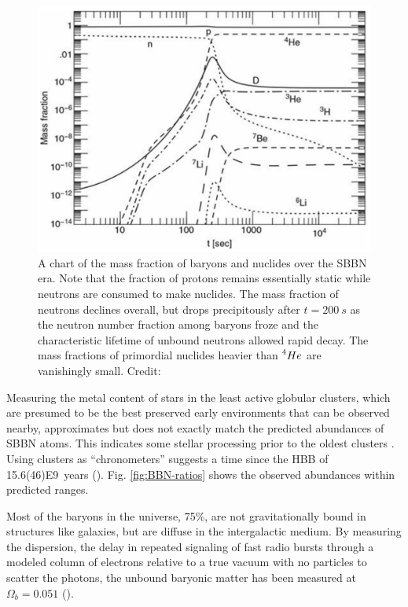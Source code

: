 \documentclass{paper}
\begin{document}
  \begin{figure}[H]
    \begin{centering}
    \includegraphics[scale=0.3]{BBN-frac.pdf}
    \caption{A chart of the mass fraction of baryons and nuclides over the
      SBBN era. Note that the fraction of protons remains essentially static
      while neutrons are consumed to make nuclides. The mass fraction of 
      neutrons declines overall, but drops precipitously after 
      \(t = \SI{200}{s}\) as the neutron number fraction among baryons froze 
      and the characteristic lifetime of unbound neutrons allowed rapid decay.
      The mass fractions of primordial nuclides heavier than 
      \(\prescript{4}{}{He}\) are vanishingly small.
    Credit: \cite{ryden2003introduction}}
    \label{fig:BBN-frac}
    \end{centering}
  \end{figure}

  Measuring the metal content of stars in the least active globular clusters, 
  which are presumed to be the best preserved early environments that can be 
  observed nearby, approximates but does not exactly match the predicted 
  abundances of SBBN atoms. This indicates some stellar processing prior to 
  the oldest clusters \cite{Kalirai_2010}. Using clusters as ``chronometers'' 
  suggests a time since the HBB of 
  \SI{15.6(46)E9}{years} (\cite{1999ApJ...521..194C}).
  Fig. \ref{fig:BBN-ratios} shows the observed abundances within predicted
  ranges.

  Most of the baryons in the universe, 75\%, are not gravitationally bound in 
  structures like galaxies, but are diffuse in the intergalactic medium. By 
  measuring the dispersion, the delay in repeated signaling of fast radio 
  bursts through a modeled column of electrons relative to a true vacuum with 
  no particles to scatter the photons, the unbound baryonic matter has been 
  measured at \(\Omega_b = 0.051\) (\cite{2020Natur.581..391M}).
\end{document}
